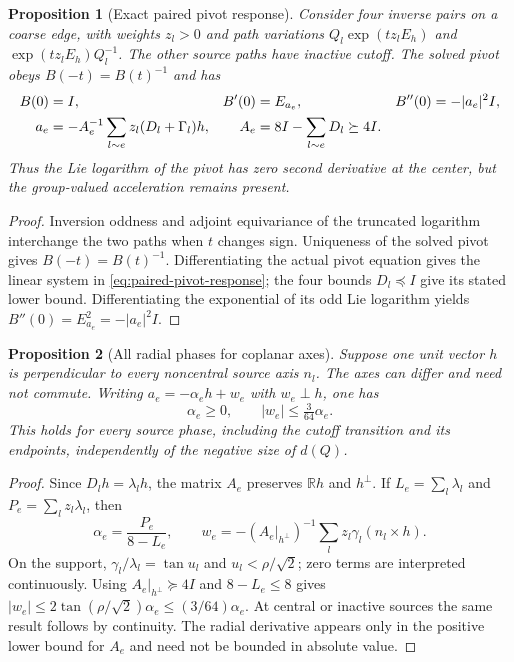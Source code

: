 \documentclass[11pt,oneside,openany]{book}
\newtheorem{proposition}[proposition]{Proposition}
\theoremstyle{definition}
\theoremstyle{remark}
\newcommand{\R}{\mathbb R}
\begin{document}
\begin{proposition}[Exact paired pivot response]
\label{prop:paired-pivot-response}
Consider four inverse pairs on a coarse edge, with weights $z_l>0$
and path variations
$Q_l\exp(tz_lE_h)$ and $\exp(tz_lE_h)Q_l^{-1}$.
The other source paths have inactive cutoff. The solved pivot obeys
$B(-t)=B(t)^{-1}$ and has
\begin{align}
 B(0)&=I,& B'(0)&=E_{a_e},& B''(0)&=-|a_e|^2I,\notag\\
 a_e&=-A_e^{-1}\sum_{l\sim e}z_l(D_l+\Gamma_l)h,&
 A_e&=8I-\sum_{l\sim e}D_l\succeq4I.
 \label{eq:paired-pivot-response}
\end{align}
Thus the Lie logarithm of the pivot has zero second derivative at the
center, but the group-valued acceleration remains present.
\end{proposition}
\begin{proof}
Inversion oddness and adjoint equivariance of the truncated logarithm
interchange the two paths when $t$ changes sign. Uniqueness of the
solved pivot gives $B(-t)=B(t)^{-1}$. Differentiating the actual pivot
equation gives the linear system in
\cref{eq:paired-pivot-response}; the four bounds $D_l\preceq I$
give its stated lower bound. Differentiating the exponential of its
odd Lie logarithm yields $B''(0)=E_{a_e}^2=-|a_e|^2I$.
\end{proof}

\begin{proposition}[All radial phases for coplanar axes]
\label{prop:paired-coplanar-cone}
Suppose one unit vector $h$ is perpendicular to every noncentral
source axis $n_l$. The axes can differ and need not commute. Writing
$a_e=-\alpha_e h+w_e$ with $w_e\perp h$, one has
\begin{equation}
 \alpha_e\ge0,\qquad |w_e|\le\tfrac3{64}\alpha_e.
 \label{eq:paired-coplanar-cone}
\end{equation}
This holds for every source phase, including the cutoff transition and
its endpoints, independently of the negative size of $d(Q)$.
\end{proposition}
\begin{proof}
Since $D_lh=\lambda_lh$, the matrix $A_e$ preserves $\R h$ and
$h^\perp$. If $L_e=\sum_l\lambda_l$ and
$P_e=\sum_lz_l\lambda_l$, then
\[
 \alpha_e=\frac{P_e}{8-L_e},\qquad
 w_e=-(A_e|_{h^\perp})^{-1}
                    \sum_lz_l\gamma_l(n_l\times h).
\]
On the support, $\gamma_l/\lambda_l=\tan u_l$ and
$u_l<\rho/\sqrt2$; zero terms are interpreted continuously.
Using $A_e|_{h^\perp}\succeq4I$ and $8-L_e\le8$ gives
$|w_e|\le2\tan(\rho/\sqrt2)\alpha_e
\le(3/64)\alpha_e$. At central or inactive sources the same result
follows by continuity. The radial derivative appears only in the
positive lower bound for $A_e$ and need not be bounded in absolute
value.
\end{proof}
\end{document}
